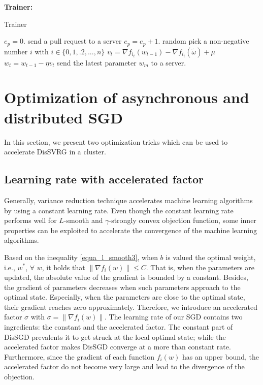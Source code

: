 \documentclass[10pt,journal,finalsubmission,compsoc]{IEEEtran}
\begin{document}
\textbf{Trainer:}



 
\begin{algorithm}[t]
    \caption{Trainer}
    \label{algorithm_dis_svrg_trainer}
    \begin{algorithmic}[1]
        \State $e_p=0.$
            \State send a pull request to a server
                    \State $e_p=e_p+1.$
                       \State random pick a non-negative number $i$ with $i\in\{0,1,.2,...,n\}$
	              \State $v_t=\nabla f_{i_t}(w_{t-1})-\nabla f_{i_t}(\tilde{\omega})+\mu$ 
	              \State $w_t=w_{t-1}-\eta v_t$ 
                    \EndFor
                    \State send the latest parameter $w_m$ to a server.
                 \EndIf 
        \EndWhile
      \EndWhile
    \end{algorithmic}
\end{algorithm}







\section{Optimization of asynchronous and distributed SGD}
\label{optimization_sgd}
In this section, we present two optimization tricks which can be used to accelerate DisSVRG in a cluster. 

\subsection{Learning rate with accelerated factor}
Generally, variance reduction technique accelerates machine learning algorithms by using a constant learning rate. Even though the constant learning rate performs well for $L$-smooth and $\gamma$-strongly convex objection function, some inner properties can be exploited to accelerate the convergence of the machine learning algorithms. 

Based on the inequality \ref{equa_l_smooth3}, when $b$ is valued the optimal weight, i.e., $w^\ast$, $\forall$ $w$, it holds that $\parallel\nabla f_i(w)\parallel \le C$. That is, when the parameters are updated, the absolute value of the gradient is bounded by a constant. Besides, the gradient of parameters decreases when such parameters approach to the optimal state. Especially, when the parameters are close to  the optimal state, their gradient reaches zero approximately. Therefore, we introduce an accelerated factor $\sigma$ with $\sigma=\parallel \nabla f_i(w)\parallel$. The learning rate of our SGD contains two ingredients: the constant and the accelerated factor. The constant part of DisSGD prevalents  it to get struck at the local optimal state; while the accelerated factor makes DisSGD converge at a more than constant rate. Furthermore, since the gradient of  each function $f_i(w)$ has an upper bound, the accelerated factor do not become very large and lead to the divergence of the objection. 
\end{document}
